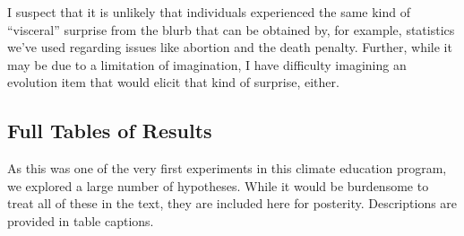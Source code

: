 I suspect that it is unlikely that individuals experienced the same kind of
``visceral'' surprise from the blurb that can be obtained by, for example,
statistics we've used regarding issues like abortion and the death penalty.
Further, while it may be due to a limitation of imagination, I have difficulty
imagining an evolution item that would elicit that kind of surprise, either.

\subsection{Full Tables of Results}

As this was one of the very first experiments in this climate education program,
we explored a large number of hypotheses. While it would be burdensome to treat
all of these in the text, they are included here for posterity. Descriptions are
provided in table captions.

 
